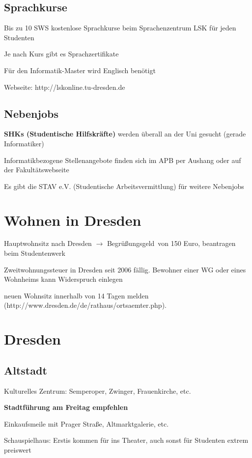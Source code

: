 \documentclass[a4paper,12pt]{report}
\begin{document}
\subsection{Sprachkurse}
\begin{itemize*}
	\item Bis zu 10 SWS kostenlose Sprachkurse beim Sprachenzentrum LSK für jeden Studenten
	\item Je nach Kurs gibt es Sprachzertifikate
	\item Für den Informatik-Master wird Englisch benötigt
	\item Webseite: http://lskonline.tu-dresden.de
\end{itemize*}

\subsection{Nebenjobs}
\begin{itemize*}
	\item \textbf{SHKs (Studentische Hilfskräfte)} werden überall an der Uni gesucht (gerade Informatiker)
	\item Informatikbezogene Stellenangebote finden sich im APB per Aushang oder auf der Fakultätswebseite
	\item Es gibt die STAV e.V. (Studentische Arbeitsvermittlung) für weitere Nebenjobs
\end{itemize*}

\section{Wohnen in Dresden}
\begin{itemize*}
	\item Hauptwohnsitz nach Dresden $\rightarrow$ \glqq Begrüßungsgeld\grqq\ von 150 Euro, beantragen beim Studentenwerk
	\item Zweitwohnungssteuer in Dresden seit 2006 fällig. Bewohner einer WG oder eines Wohnheims kann Widerspruch einlegen
	\item neuen Wohnsitz innerhalb von 14 Tagen melden\\
	(http://www.dresden.de/de/rathaus/ortsaemter.php).
\end{itemize*}

\section{Dresden}

\subsection{Altstadt}
\begin{itemize*}
	\item Kulturelles Zentrum: Semperoper, Zwinger, Frauenkirche, etc.
	\item \textbf{Stadtführung am Freitag empfehlen}
	\item Einkaufsmeile mit Prager Straße, Altmarktgalerie, etc.
	\item Schauspielhaus: Erstis kommen für  ins Theater, auch sonst für Studenten extrem preiswert
\end{itemize*}
\end{document}
